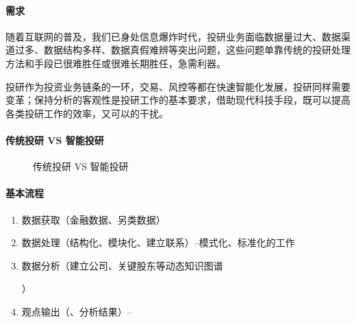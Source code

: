 \documentclass[letterpaper,11pt,english]{sphinxmanual}
\begin{document}
\begin{center}
{{\paragraph{需求}
\label{\detokenize{chapter_AI+Finance/AI_Investment_Research:id3}}
随着互联网的普及，我们已身处信息爆炸时代，投研业务面临数据量过大、数据渠道过多、数据结构多样、数据真假难辨等突出问题，这些问题单靠传统的投研处理方法和手段已很难胜任或很难长期胜任，急需利器。

投研作为投资业务链条的一环，交易、风控等都在快速智能化发展，投研同样需要变革；保持分析的客观性是投研工作的基本要求，借助现代科技手段，既可以提高各类投研工作的效率，又可以的干扰。


\paragraph{传统投研 VS 智能投研}
\label{\detokenize{chapter_AI+Finance/AI_Investment_Research:vs}}
\begin{figure}[H]
\centering
\capstart

\noindent{}
\caption{传统投研 VS 智能投研}\label{\detokenize{chapter_AI+Finance/AI_Investment_Research:id9}}\end{figure}


\paragraph{基本流程}
\label{\detokenize{chapter_AI+Finance/AI_Investment_Research:id4}}\begin{enumerate}
%
\item {} 
数据获取（金融数据、另类数据）

\item {} 
数据处理（结构化、模块化、建立联系）–模式化、标准化的工作

\item {} 
数据分析（建立公司、关键股东等动态知识图谱%
\begin{footnote}[965]\sphinxAtStartFootnote
{}
%
\end{footnote}）

\item {} 
观点输出（、分析结果）–

\end{enumerate}


}}
\end{center}
\end{document}
